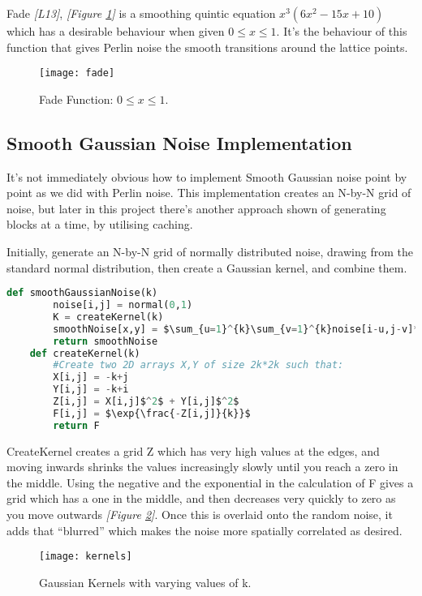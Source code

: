 \documentclass[11pt,a4paper]{article}
\begin{document}
Fade \emph{[L13]}, \emph{[Figure \ref{fig:fade}]} is a smoothing quintic equation $x^3(6x^2-15x+10)$ which has a desirable behaviour when given $0\le x\le 1$. It’s the behaviour of this function that gives Perlin noise the smooth transitions around the lattice points.

\begin{figure}[h]
	\centering
	\texttt{[image: fade]}
	\caption{Fade Function: $0\le x\le1$.}
	\label{fig:fade} 
\end{figure}

\subsection{Smooth Gaussian Noise Implementation}

It’s not immediately obvious how to implement Smooth Gaussian noise point by point as we did with Perlin noise. This implementation creates an N-by-N grid of noise, but later in this project there’s another approach shown of generating blocks at a time, by utilising caching. 

Initially, generate an N-by-N grid of normally distributed noise, drawing from the standard normal distribution, then create a Gaussian kernel, and combine them.

\begin{lstlisting}[language=Python, mathescape=true]
	def smoothGaussianNoise(k)
		noise[i,j] = normal(0,1)
		K = createKernel(k)
		smoothNoise[x,y] = $\sum_{u=1}^{k}\sum_{v=1}^{k}noise[i-u,j-v]*K[u,v]$
		return smoothNoise
	def createKernel(k)
		#Create two 2D arrays X,Y of size 2k*2k such that:
		X[i,j] = -k+j
		Y[i,j] = -k+i
		Z[i,j] = X[i,j]$^2$ + Y[i,j]$^2$
		F[i,j] = $\exp{\frac{-Z[i,j]}{k}}$
		return F
\end{lstlisting}

CreateKernel creates a grid Z which has very high values at the edges, and moving inwards shrinks the values increasingly slowly until you reach a zero in the middle. Using the negative and the exponential in the calculation of F gives a grid which has a one in the middle, and then decreases very quickly to zero as you move outwards \emph{[Figure \ref{fig:kernels}]}. Once this is overlaid onto the random noise, it adds that “blurred” which makes the noise more spatially correlated as desired.

\begin{figure}[h]
	\centering
	\texttt{[image: kernels]}
	\caption{Gaussian Kernels with varying values of k.}
	\label{fig:kernels} 
\end{figure}
\end{document}
